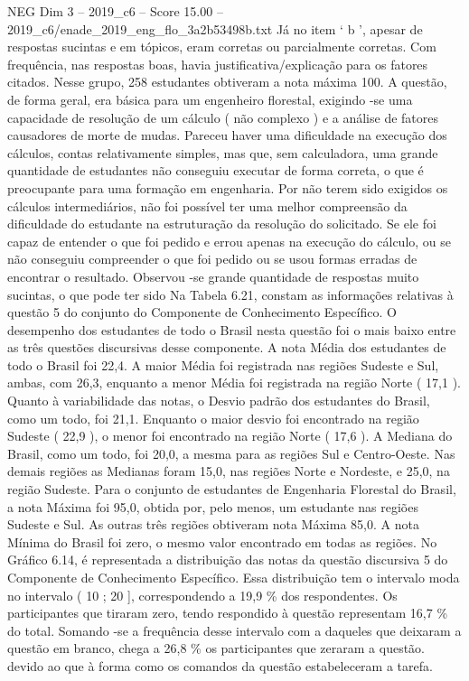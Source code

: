 \begin{textsample}{NEG Dim 3 – 2019\_c6 – Score 15.00 – 2019\_c6/enade\_2019\_eng\_flo\_3a2b53498b.txt}
Já no item ‘ b ’, apesar de respostas sucintas e em tópicos, eram corretas ou parcialmente corretas.
Com frequência, nas respostas boas, havia justificativa/explicação para os fatores citados.
Nesse grupo, 258 estudantes obtiveram a nota máxima 100.
A questão, de forma geral, era básica para um engenheiro florestal, exigindo -se uma capacidade de resolução de um cálculo ( não complexo ) e a análise de fatores causadores de morte de mudas.
Pareceu haver uma dificuldade na execução dos cálculos, contas relativamente simples, mas que, sem calculadora, uma grande quantidade de estudantes não conseguiu executar de forma correta, o que é preocupante para uma formação em engenharia.
Por não terem sido exigidos os cálculos intermediários, não foi possível ter uma melhor compreensão da dificuldade do estudante na estruturação da resolução do solicitado.
Se ele foi capaz de entender o que foi pedido e errou apenas na execução do cálculo, ou se não conseguiu compreender o que foi pedido ou se usou formas erradas de encontrar o resultado.
Observou -se grande quantidade de respostas muito sucintas, o que pode ter sido Na Tabela 6.21, constam as informações relativas à questão 5 do conjunto do Componente de Conhecimento Específico.
O desempenho dos estudantes de todo o Brasil nesta questão foi o mais baixo entre as três questões discursivas desse componente.
A nota Média dos estudantes de todo o Brasil foi 22,4.
A maior Média foi registrada nas regiões Sudeste e Sul, ambas, com 26,3, enquanto a menor Média foi registrada na região Norte ( 17,1 ).
Quanto à variabilidade das notas, o Desvio padrão dos estudantes do Brasil, como um todo, foi 21,1.
Enquanto o maior desvio foi encontrado na região Sudeste ( 22,9 ), o menor foi encontrado na região Norte ( 17,6 ).
A Mediana do Brasil, como um todo, foi 20,0, a mesma para as regiões Sul e Centro-Oeste.
Nas demais regiões as Medianas foram 15,0, nas regiões Norte e Nordeste, e 25,0, na região Sudeste.
Para o conjunto de estudantes de Engenharia Florestal do Brasil, a nota Máxima foi 95,0, obtida por, pelo menos, um estudante nas regiões Sudeste e Sul.
As outras três regiões obtiveram nota Máxima 85,0.
A nota Mínima do Brasil foi zero, o mesmo valor encontrado em todas as regiões.
No Gráfico 6.14, é representada a distribuição das notas da questão discursiva 5 do Componente de Conhecimento Específico.
Essa distribuição tem o intervalo moda no intervalo ( 10 ; 20 ], correspondendo a 19,9 \% dos respondentes.
Os participantes que tiraram zero, tendo respondido à questão representam 16,7 \% do total.
Somando -se a frequência desse intervalo com a daqueles que deixaram a questão em branco, chega a 26,8 \% os participantes que zeraram a questão. devido ao que à forma como os comandos da questão estabeleceram a tarefa.

\end{textsample}
